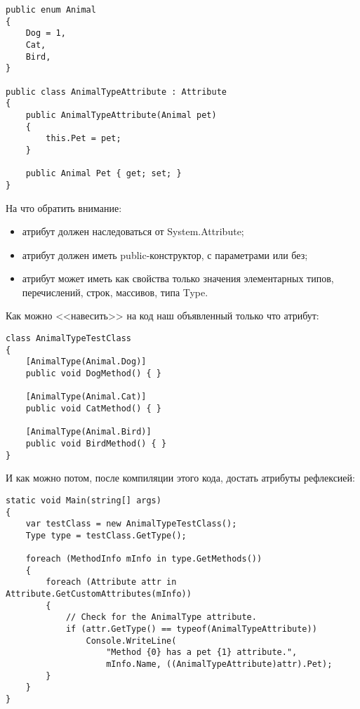 \documentclass[a5paper]{article}
\begin{document}
\begin{verbatim}
public enum Animal
{
    Dog = 1,
    Cat,
    Bird,
}

public class AnimalTypeAttribute : Attribute
{
    public AnimalTypeAttribute(Animal pet)
    {
        this.Pet = pet;
    }

    public Animal Pet { get; set; }
}
\end{verbatim}

На что обратить внимание:

\begin{itemize}
    \item атрибут должен наследоваться от System.Attribute;
    \item атрибут должен иметь public-конструктор, с параметрами или без;
    \item атрибут может иметь как свойства только значения элементарных типов, перечислений, строк, массивов, типа Type.
\end{itemize}

Как можно <<навесить>> на код наш объявленный только что атрибут:

\begin{verbatim}
class AnimalTypeTestClass
{
    [AnimalType(Animal.Dog)]
    public void DogMethod() { }

    [AnimalType(Animal.Cat)]
    public void CatMethod() { }

    [AnimalType(Animal.Bird)]
    public void BirdMethod() { }
}
\end{verbatim}

И как можно потом, после компиляции этого кода, достать атрибуты рефлексией:

\begin{verbatim}
static void Main(string[] args)
{
    var testClass = new AnimalTypeTestClass();
    Type type = testClass.GetType();

    foreach (MethodInfo mInfo in type.GetMethods())
    {
        foreach (Attribute attr in Attribute.GetCustomAttributes(mInfo))
        {
            // Check for the AnimalType attribute.
            if (attr.GetType() == typeof(AnimalTypeAttribute))
                Console.WriteLine(
                    "Method {0} has a pet {1} attribute.",
                    mInfo.Name, ((AnimalTypeAttribute)attr).Pet);
        }
    }
}
\end{verbatim}
\end{document}
